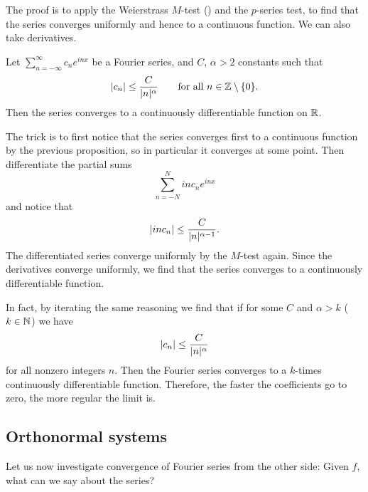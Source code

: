 The proof is to apply the Weierstrass $M$-test () and
the $p$-series test, to find that the series converges uniformly and hence
to a continuous function.
We can also take derivatives.

\begin{prop}
Let $\sum_{n=-\infty}^\infty c_n e^{inx}$ be a Fourier series,
and $C$, $\alpha > 2$ constants such that
\begin{equation*}
\lvert {c_n} \rvert \leq \frac{C}{\lvert {n} \rvert^\alpha}
\qquad \text{for all $n \in {\mathbb{Z}} \setminus \{ 0 \}$}.
\end{equation*}
Then the series converges to a continuously differentiable function on ${\mathbb{R}}$.
\end{prop}

The trick is to first notice that the series converges first to a continuous
function by the previous proposition, so in particular it converges at some
point.  Then differentiate the partial sums
\begin{equation*}
\sum_{n=-N}^{N}
i n c_n e^{inx}
\end{equation*}
and notice that 
\begin{equation*}
\lvert {i n c_n} \rvert \leq \frac{C}{\lvert {n} \rvert^{\alpha-1}} .
\end{equation*}
The differentiated series converge uniformly by the $M$-test again.  Since
the derivatives converge uniformly, we find that the series converges 
to a continuously differentiable function.

In fact, by iterating the same reasoning we find that if
for some $C$ and $\alpha > k$ ($k \in {\mathbb{N}}$) we have
\begin{equation*}
\lvert {c_n} \rvert 
\leq \frac{C}{\lvert {n} \rvert^\alpha}
\end{equation*}
for all nonzero integers $n$.  Then 
the Fourier series converges to a $k$-times continuously differentiable
function.  Therefore, the faster the coefficients go to zero, the more
regular the limit is.

\subsection{Orthonormal systems}

Let us now investigate convergence of Fourier series from the other side:
Given $f$, what can we say about the series?

